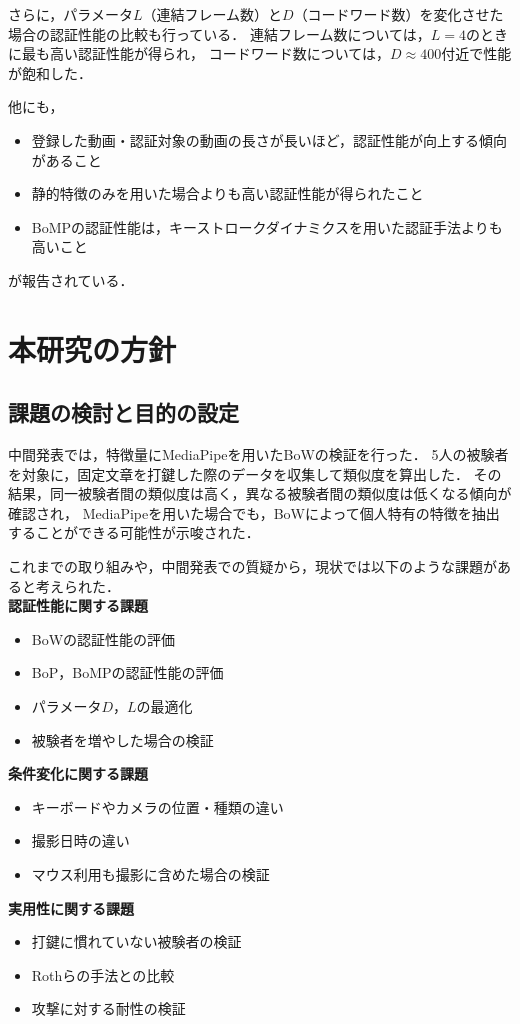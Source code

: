 \documentclass[twoside,twocolumn]{ujarticle}
\begin{document}
さらに，パラメータ$L$（連結フレーム数）と$D$（コードワード数）を変化させた場合の認証性能の比較も行っている．
連結フレーム数については，$L = 4$のときに最も高い認証性能が得られ，
コードワード数については，$D \approx 400$付近で性能が飽和した．

他にも，
\begin{itemize}
  \setlength{\parskip}{0cm}
  \setlength{\itemsep}{0cm}
  \item 登録した動画・認証対象の動画の長さが長いほど，認証性能が向上する傾向があること
  \item 静的特徴のみを用いた場合よりも高い認証性能が得られたこと
  \item BoMPの認証性能は，キーストロークダイナミクスを用いた認証手法よりも高いこと
\end{itemize}
が報告されている．

%
%
\section{本研究の方針}
%

\subsection{課題の検討と目的の設定}

中間発表では，特徴量にMediaPipeを用いたBoWの検証を行った．
5人の被験者を対象に，固定文章を打鍵した際のデータを収集して類似度を算出した．
その結果，同一被験者間の類似度は高く，異なる被験者間の類似度は低くなる傾向が確認され，
MediaPipeを用いた場合でも，BoWによって個人特有の特徴を抽出することができる可能性が示唆された．

これまでの取り組みや，中間発表での質疑から，現状では以下のような課題があると考えられた．\\

\noindent \textbf{認証性能に関する課題}
\begin{itemize}
  \setlength{\parskip}{0cm}
  \setlength{\itemsep}{0cm}
  \item BoWの認証性能の評価
  \item BoP，BoMPの認証性能の評価
  \item パラメータ$D$，$L$の最適化
  \item 被験者を増やした場合の検証
\end{itemize}
\textbf{条件変化に関する課題}
\begin{itemize}
  \setlength{\parskip}{0cm}
  \setlength{\itemsep}{0cm}
  \item キーボードやカメラの位置・種類の違い
  \item 撮影日時の違い  
  \item マウス利用も撮影に含めた場合の検証
\end{itemize}
\textbf{実用性に関する課題}
\begin{itemize}
  \setlength{\parskip}{0cm}
  \setlength{\itemsep}{0cm}
  \item 打鍵に慣れていない被験者の検証
  \item Rothらの手法との比較
  \item 攻撃に対する耐性の検証
\end{itemize}
\end{document}
